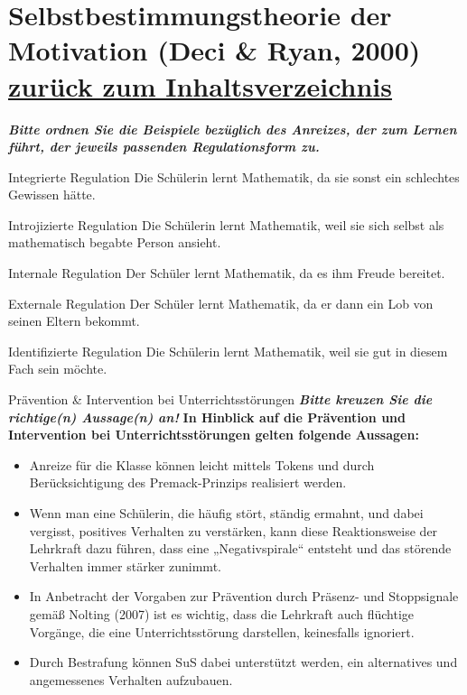 \documentclass[a4paper]{article}
\newcommand{\ACorrectAnswer}{\rlap{$\square$}{\raisebox{2pt}{\large\hspace{1pt}\ding{51}}}\hspace{-2.5pt}}
\newcommand{\AWrongAnswer}{\rlap{$\square$}{\large\hspace{1pt}\ding{55}}}
\newcommand{\AnUnsureAnswer}{\rlap{$\square$}{\large\hspace{1pt}\textbf?}}
\newcommand{\defaultCorrect}{\ding{51}}
\newcommand{\defaultWrong}{\ding{55}}
\newcommand{\defaultUnsure}{\textbf{?}}
\newenvironment{answers}{\begin{itemize}}{\end{itemize}}
\newcommand{\correct}{\defaultCorrect}
\newcommand{\wrong}{\defaultWrong}
\newcommand{\unsure}{\defaultUnsure}
\newenvironment{question}[2]{%
    \section[#1 \normalfont(#2)]{#1\\\small\normalfont\hyperlink{tableofcontents}{zurück zum Inhaltsverzeichnis}}%
}{%
    \newpage%
}
\newcommand{\questiontext}[1]{\textbf{#1}}
\newcommand{\assignment}[1]{\textbf{\textit{#1}}\newline}
\newenvironment{multiple-choice}[1]{%
    \begin{question}{#1}{Multiple Choice}%
    \renewenvironment{answers}{%
        \begin{multiple-choice-list}}{\end{multiple-choice-list}%
    }%
    \renewcommand{\correct}{\ACorrectAnswer}%
    \renewcommand{\wrong}{\AWrongAnswer}%
    \renewcommand{\unsure}{\AnUnsureAnswer}%
}%
{%
    \renewcommand{\correct}{\defaultCorrect}%
    \renewcommand{\wrong}{\defaultWrong}%
    \renewcommand{\unsure}{\defaultUnsure}%
    \end{question}%
}
\newenvironment{mapping}[1]{%
    \begin{question}{#1}{Zuordnungsaufgabe}%
    \newcommand{\ismappedto}{\tcblower}%
    \newenvironment{answer}{\begin{mapping-box}}{\end{mapping-box}}%
}{%
    \end{question}%
}
\begin{document}
\begin{mapping}{Selbstbestimmungstheorie der Motivation (Deci \& Ryan, 2000)}
    \assignment{Bitte ordnen Sie die Beispiele bezüglich des Anreizes, der zum Lernen führt, der jeweils passenden Regulationsform zu.}
    \begin{answer}
        Integrierte Regulation
        \ismappedto
        Die Schülerin lernt Mathematik, da sie sonst ein schlechtes Gewissen hätte.
    \end{answer}
    \begin{answer}
        Introjizierte Regulation
        \ismappedto
        Die Schülerin lernt Mathematik, weil sie sich selbst als mathematisch begabte Person ansieht.
    \end{answer}
    \begin{answer}
        Internale Regulation
        \ismappedto
        Der Schüler lernt Mathematik, da es ihm Freude bereitet.
    \end{answer}
    \begin{answer}
        Externale Regulation
        \ismappedto
        Der Schüler lernt Mathematik, da er dann ein Lob von seinen Eltern bekommt.
    \end{answer}
    \begin{answer}
        Identifizierte Regulation
        \ismappedto
        Die Schülerin lernt Mathematik, weil sie gut in diesem Fach sein möchte.
    \end{answer}
\end{mapping}

\begin{multiple-choice}{Prävention \& Intervention bei Unterrichtsstörungen}
    \assignment{Bitte kreuzen Sie die richtige(n) Aussage(n) an!}
    \questiontext{In Hinblick auf die Prävention und Intervention bei Unterrichtsstörungen gelten folgende Aussagen:}
    \begin{answers}
        \item[\correct] Anreize für die Klasse können leicht mittels Tokens und durch Berücksichtigung des Premack-Prinzips realisiert werden.
        \item[\correct] Wenn man eine Schülerin, die häufig stört, ständig ermahnt, und dabei vergisst, positives Verhalten zu verstärken, kann diese Reaktionsweise der Lehrkraft dazu führen, dass eine „Negativspirale“ entsteht und das störende Verhalten immer stärker zunimmt.
        \item[\correct] In Anbetracht der Vorgaben zur Prävention durch Präsenz- und Stoppsignale gemäß Nolting (2007) ist es wichtig, dass die Lehrkraft auch flüchtige Vorgänge, die eine Unterrichtsstörung darstellen, keinesfalls ignoriert.
        \item[\wrong] Durch Bestrafung können SuS dabei unterstützt werden, ein alternatives und angemessenes Verhalten aufzubauen.
    \end{answers}
\end{multiple-choice}
\end{document}
